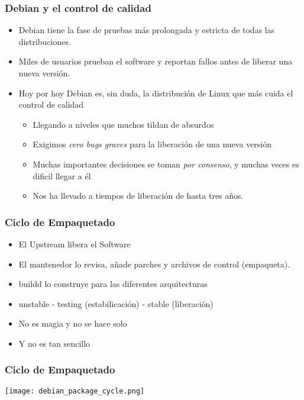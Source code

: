 \documentclass{beamer}
\begin{document}
\begin{frame}
  \frametitle {Debian y el control de calidad}
  \begin{itemize} 
    \item Debian tiene la fase de pruebas más prolongada y estricta de
      todas las distribuciones. 
    \item Miles de usuarios prueban el software y reportan fallos
      antes de liberar una nueva versión. 
    \item Hoy por hoy Debian es, sin duda, la distribución de Linux
      que más cuida el control de calidad 
      \begin{itemize}
      \item Llegando a niveles que muchos tildan de absurdos
      \item Exigimos {\em cero bugs graves} para la liberación de una
        nueva versión
      \item Muchas importantes decisiones se toman {\em por consenso},
        y muchas veces es dificil llegar a él
      \item Nos ha llevado a tiempos de liberación de hasta tres
        años. 
      \end{itemize}
  \end{itemize}
\end{frame}

\begin{frame}
  \frametitle {Ciclo de Empaquetado}
  \begin{itemize} 
  \item El Upstream libera el Software
  \item El mantenedor lo revisa, añade parches y archivos de control (empaqueta).
  \item buildd lo construye para las diferentes arquitecturas
  \item unstable - testing (estabilicación) - stable (liberación)
  \item No es magia y no se hace solo
  \pause
  \item Y no es tan sencillo
  \end{itemize}
\end{frame}

\begin{frame}
  \begin{center}
  \frametitle {Ciclo de Empaquetado}
  \texttt{[image: debian\_package\_cycle.png]}
  \end{center}
\end{frame}
\end{document}
